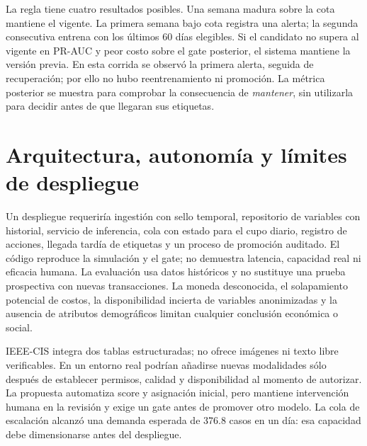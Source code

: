 \documentclass[11pt,letterpaper]{article}
\begin{document}
La regla tiene cuatro resultados posibles. Una semana madura sobre la cota mantiene el vigente. La primera semana bajo cota registra una alerta; la segunda consecutiva entrena con los últimos 60 días elegibles. Si el candidato no supera al vigente en PR-AUC y peor costo sobre el gate posterior, el sistema mantiene la versión previa. En esta corrida se observó la primera alerta, seguida de recuperación; por ello no hubo reentrenamiento ni promoción. La métrica posterior se muestra para comprobar la consecuencia de \emph{mantener}, sin utilizarla para decidir antes de que llegaran sus etiquetas.

\clearpage
\section{Arquitectura, autonomía y límites de despliegue}

\begin{center}\small
{}
\end{center}

Un despliegue requeriría ingestión con sello temporal, repositorio de variables con historial, servicio de inferencia, cola con estado para el cupo diario, registro de acciones, llegada tardía de etiquetas y un proceso de promoción auditado. El código reproduce la simulación y el gate; no demuestra latencia, capacidad real ni eficacia humana. La evaluación usa datos históricos y no sustituye una prueba prospectiva con nuevas transacciones. La moneda desconocida, el solapamiento potencial de costos, la disponibilidad incierta de variables anonimizadas y la ausencia de atributos demográficos limitan cualquier conclusión económica o social.

IEEE-CIS integra dos tablas estructuradas; no ofrece imágenes ni texto libre verificables. En un entorno real podrían añadirse nuevas modalidades sólo después de establecer permisos, calidad y disponibilidad al momento de autorizar. La propuesta automatiza score y asignación inicial, pero mantiene intervención humana en la revisión y exige un gate antes de promover otro modelo. La cola de escalación alcanzó una demanda esperada de 376.8 casos en un día: esa capacidad debe dimensionarse antes del despliegue.
\end{document}
